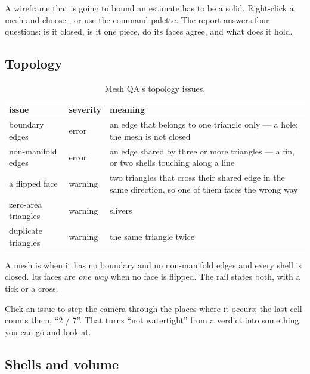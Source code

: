 A wireframe that is going to bound an estimate has to be a solid. Right-click a mesh and choose , or use the command palette. The report answers four questions: is it closed, is it one piece, do its faces agree, and what does it hold.


\subsection{Topology}

\begin{table}[htbp]\small
\begin{tabularx}{\linewidth}{@{}llL@{}}\toprule
issue & severity & meaning \\ \midrule
boundary edges & error & an edge that belongs to one triangle only — a hole; the mesh is not closed \\
non-manifold edges & error & an edge shared by three or more triangles — a fin, or two shells touching along a line \\
a flipped face & warning & two triangles that cross their shared edge in the same direction, so one of them faces the wrong way \\
zero-area triangles & warning & slivers \\
duplicate triangles & warning & the same triangle twice \\ \bottomrule
\end{tabularx}
\caption{Mesh QA's topology issues.}\label{tab:qa-mesh}
\end{table}

A mesh is  when it has no boundary and no non-manifold edges and every shell is closed. Its faces are \emph{one way} when no face is flipped. The rail states both, with a tick or a cross.

Click an issue to step the camera through the places where it occurs; the last cell counts them, “2 / 7”. That turns “not watertight” from a verdict into something you can go and look at.

\subsection{Shells and volume}

